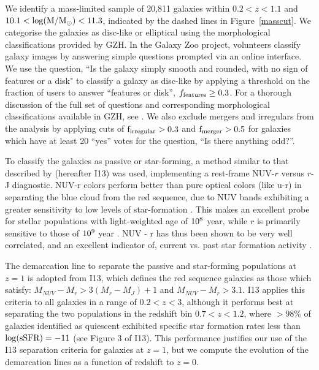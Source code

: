 \documentclass[useAMS,usenatbib]{mn2e}
\begin{document}
We identify a mass-limited sample of 20,811 galaxies within $0.2<z<1.1$ and $10.1<\rm \log(M/M_{\odot})<11.3$, indicated by the dashed lines in Figure~\ref{masscut}. We categorise the galaxies as disc-like or elliptical using the morphological classifications provided by GZH. In the Galaxy Zoo project, volunteers classify galaxy images by answering simple questions prompted via an online interface. We use the question, ``Is the galaxy simply smooth and rounded, with no sign of features or a disk" to classify a galaxy as disc-like by applying a threshold on the fraction of users to answer ``features or disk'', $f_{\rm features}\ge0.3$. For a thorough discussion of the full set of questions and corresponding morphological classifications available in GZH, see \citet{Willett2016}. We also exclude mergers and irregulars from the analysis by applying cuts of $\rm f_{irregular} > 0.3$ and $\rm f_{merger} > 0.5$ for galaxies which have at least 20 ``yes'' votes for the question, ``Is there anything odd?''. 

To classify the galaxies as passive or star-forming, a method similar to that described by \citet{Ilbert2013} (hereafter I13) was used, implementing a rest-frame NUV-$r$ versus $r$-J diagnostic. NUV-r colors perform better than pure optical colors (like u-r) in separating the blue cloud from the red sequence, due to NUV bands exhibiting a greater sensitivity to low levels of star-formation \citep{Martin2007,Wyder2007}. This makes an excellent probe for stellar populations with light-weighted age of $\rm 10^8$ year, while $r$ is primarily sensitive to those of $\rm 10^9$ year \citep{Arnouts2007a}. NUV - r has thus been shown to be very well correlated, and an excellent indicator of, current vs. past star formation activity \citep{Martin2005,Salim2005a}.  

The demarcation line to separate the passive and star-forming populations at $z=1$ is adopted from I13, which defines the red sequence galaxies as those which satisfy: $M_{NUV}-M_{r} > 3(M_{r}-M_{J})+1$ and $M_{NUV}-M_{r} > 3.1$. I13 applies this criteria to all galaxies in a range of $0.2<z<3$, although it performs best at separating the two populations in the redshift bin $0.7<z<1.2$, where $>98\%$ of galaxies identified as quiescent exhibited specific star formation rates less than $\rm \log(sSFR) = -11$ (see Figure 3 of I13). This performance justifies our use of the I13 separation criteria for galaxies at $z=1$, but we compute the evolution of the demarcation lines as a function of redshift to $z=0$. 
\end{document}
